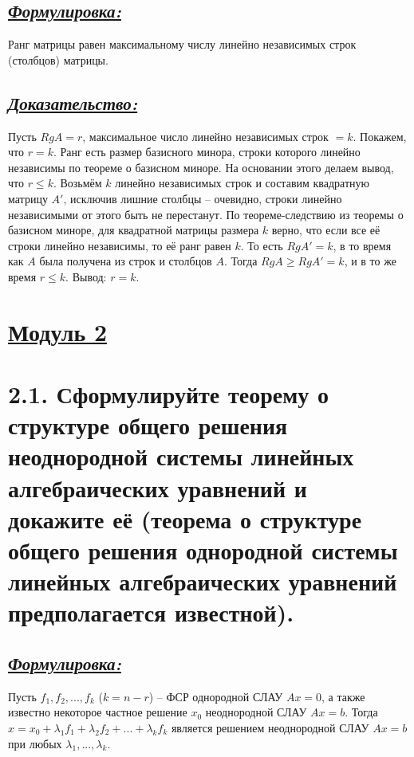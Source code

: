 \documentclass{article}
\begin{document}
\subsection*{\Large \underline{\textit{Формулировка: }}}
Ранг матрицы равен максимальному числу линейно независимых строк (столбцов) матрицы.

\subsection*{\Large \underline{\textit{Доказательство: }}}
Пусть $RgA = r$, максимальное число линейно независимых строк $= k$. Покажем, что $r = k$.
\newline Ранг есть размер базисного минора, строки которого линейно независимы по теореме о базисном миноре. На основании этого делаем вывод, что $r \le k$. Возьмём $k$ линейно независимых строк и составим квадратную матрицу $A'$, исключив лишние столбцы -- очевидно, строки линейно независимыми от этого быть не перестанут. По теореме-следствию из теоремы о базисном миноре, для квадратной матрицы размера $k$ верно, что если все её строки линейно независимы, то её ранг равен $k$. То есть $RgA' = k$, в то время как $A$ была получена из строк и столбцов $A$. Тогда $RgA \ge RgA' = k$, и в то же время $r \le k$. Вывод: $r = k$.

\newpage
{}
\section*{\LARGE\centering \underline{Модуль 2}}

\section*{\LARGE 2.1. Сформулируйте теорему о структуре общего решения неоднородной системы линейных алгебраических уравнений и докажите её (теорема о структуре общего решения однородной системы линейных алгебраических уравнений предполагается известной).}
\subsection*{\Large \underline{\textit{Формулировка: }}}
Пусть $f_1, f_2, ..., f_k$ ($k = n - r$) -- ФСР однородной СЛАУ $Ax = 0$, а также известно некоторое частное решение $x_0$ неоднородной СЛАУ $Ax = b$. Тогда $x = x_0 + \lambda_1f_1 + \lambda_2f_2 + ... + \lambda_kf_k$ является решением неоднородной СЛАУ $Ax = b$ при любых $\lambda_1, ..., \lambda_k$.
\end{document}
